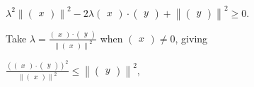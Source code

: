 \(\lambda^{2}\left\| \begin{pmatrix}
x
\end{pmatrix} \right\|^{2} - 2\lambda\begin{pmatrix}
x
\end{pmatrix} \cdot \begin{pmatrix}
y
\end{pmatrix} + \left\| \begin{pmatrix}
y
\end{pmatrix} \right\|^{2} \geq 0.\)

Take \(\lambda = \frac{\begin{pmatrix}
x
\end{pmatrix} \cdot \begin{pmatrix}
y
\end{pmatrix}}{\left\| \begin{pmatrix}
x
\end{pmatrix} \right\|^{2}}\) when \(\begin{pmatrix}
x
\end{pmatrix} \neq 0\), giving

\(\frac{\left( {\begin{pmatrix}
x
\end{pmatrix} \cdot \begin{pmatrix}
y
\end{pmatrix}} \right)^{2}}{\left\| \begin{pmatrix}
x
\end{pmatrix} \right\|^{2}} \leq \left\| \begin{pmatrix}
y
\end{pmatrix} \right\|^{2},\)

